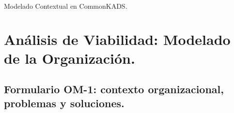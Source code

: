 \documentclass[12pt,a4paper,twoside,spanish]{article}      %
\begin{document}
\pagestyle{myheadings}  {Modelado Contextual en CommonKADS.}

\setlength{\parindent}{1,5cm} \setlength{\parskip}{0,7cm}

\section{Análisis de Viabilidad: Modelado de la Organización.}



\subsection{Formulario OM-1: contexto organizacional, problemas y soluciones.}
\end{document}
